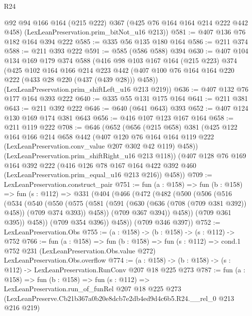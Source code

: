 \begin{lexlean}{R24}
\begin{coremodule}
      @92
      @94
      @166
      @164
      (@215 @222)
      @367
      (@425 @76 @164 @164 @214 @222 @442 @458)
      (LexLeanPreservation.prim_bitNot_u16 @213))
@581 := @407 @136 @76 @182 @164 @394 @222
@585 := @335 @56 @135 @180 @164
@586 := @211 @374
@588 := @211 @393 @222
@591 := @585 (@586 @588) @394
@630 := @407
    @104
    @134
    @169
    @179
    @374
    @588
    (@416
      @98
      @103
      @167
      @164
      (@215 @223)
      @374
      (@425
        @102
        @164
        @166
        @214
        @223
        @442
        (@407 @100 @76 @164 @164 @220 @222 (@433 @28 @220 (@437 (@439 @28))) @458))
      (LexLeanPreservation.prim_shiftLeft_u16 @213 @219))
@636 := @407 @132 @76 @177 @164 @393 @222
@640 := @335 @55 @131 @175 @164
@641 := @211 @381
@643 := @211 @392 @222
@646 := @640 (@641 @643) @393
@652 := @407 @124 @130 @169 @174 @381 @643
@656 := @416 @107 @123 @167 @164
@658 := @211 @119 @222
@708 := @646
    (@652
      (@656
        (@215 @658)
        @381
        (@425
          @122
          @164
          @166
          @214
          @658
          @442
          (@407
            @120
            @76
            @164
            @164
            @119
            @222
            (LexLeanPreservation.conv_value @207 @302 @42 @119)
            @458))
        (LexLeanPreservation.prim_shiftRight_u16 @213 @118))
      (@407
        @128
        @76
        @169
        @164
        @392
        @222
        (@416 @126 @78 @167 @164 @422 @392 @460 (LexLeanPreservation.prim_equal_u16 @213 @216))
        @458))
@709 := LexLeanPreservation.construct_pair
@751 := fun (a : @158) =>
  fun (b : @158) =>
  fun (s : @112) =>
  @331
    (@404
      (@466
        (@472
          (@482
            (@500
              (@506
                (@516
                  (@534
                    (@540
                      (@550
                        (@575
                          (@581
                            (@591 (@630 (@636 (@708 (@709 @381 @392)) @458)) (@709 @374 @393))
                            @458))
                        (@709 @367 @394))
                      @458))
                  (@709 @361 @395))
                @458))
            (@709 @354 @396))
          @458))
      (@709 @346 @397))
@752 := LexLeanPreservation.Obs
@755 := (a : @158) -> (b : @158) -> (s : @112) -> @752
@766 := fun (a : @158) =>
  fun (b : @158) =>
  fun (s : @112) =>
  cond.{1} @752 @231 (LexLeanPreservation.Obs.value @272) LexLeanPreservation.Obs.overflow
@774 := (a : @158) -> (b : @158) -> (s : @112) -> LexLeanPreservation.RunConv @207 @18 @225 @273
@787 := fun (a : @158) =>
  fun (b : @158) =>
  fun (s : @112) =>
  LexLeanPreservation.run_of_funRel
    @207
    @18
    @225
    @273
    (LexLeanPreserve.Cb21b367a0b20e8dcb7e2db4ed9d4c6b5.R24.__rel_0 @213 @216 @219)
\end{coremodule}
\end{lexlean}
